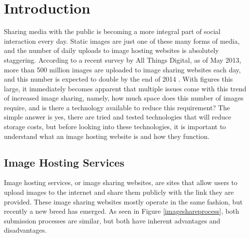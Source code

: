 %
%

\chapter{Introduction}\label{ch:intro} %


Sharing media with the public is becoming a more integral part of social interaction every day. Static images are just one of these many forms of media, and the number of daily uploads to image hosting websites is absolutely staggering. According to a recent survey by All Things Digital, as of May 2013, more than 500 million images are uploaded to image sharing websites each day, and this number is expected to double by the end of 2014 \cite{meek:500}. With figures this large, it immediately becomes apparent that multiple issues come with this trend of increased image sharing, namely, how much space does this number of images require, and is there a technology available to reduce this requirement? The simple answer is yes, there are tried and tested technologies that will reduce storage costs, but before looking into these technologies, it is important to understand what an image hosting website is and how they function.

\section{Image Hosting Services} \label{sec:imagehostingservices}
Image hosting services, or image sharing websites, are sites that allow users to upload images to the internet and share them publicly with the link they are provided. These image sharing websites mostly operate in the same fashion, but recently a new breed has emerged. As seen in Figure \ref{imageshareprocess}, both submission processes are similar, but both have inherent advantages and disadvantages.

